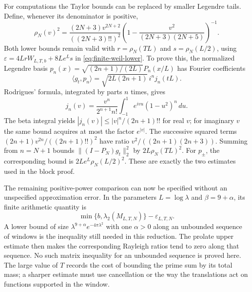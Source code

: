 For computations the Taylor bounds can be replaced by smaller
Legendre tails.  Define, whenever its denominator is positive,
\[
 \rho_N(v)^2=
 \frac{(2N+3)v^{2N+2}}{((2N+3)!!)^2}
 \left(1-\frac{v^2}{(2N+3)(2N+5)}\right)^{-1}.
\]
Both lower bounds remain valid with
$r=\rho_N(TL)$ and $s=\rho_N(L/2)$, using
$\varepsilon=4LrW_{L,T,b}+8Le^Ls$ in
\eqref{eq:finite-weil-lower}.  To prove this, the normalized Legendre
basis $p_n(x)=\sqrt{(2n+1)/(2L)}P_n(x/L)$ has Fourier coefficients
\[
 \langle g_t,p_n\rangle
        =\sqrt{2L(2n+1)}\,i^n j_n(tL).
\]
Rodrigues' formula, integrated by parts $n$ times, gives
\[
 j_n(v)=\frac{v^n}{2^{n+1}n!}
                  \int_{-1}^1e^{ivu}(1-u^2)^n\,du.
\]
The beta integral yields
$|j_n(v)|\le |v|^n/(2n+1)!!$ for real $v$; for imaginary $v$ the
same bound acquires at most the factor $e^{|v|}$.
The successive squared terms
$(2n+1)v^{2n}/((2n+1)!!)^2$ have ratio
$v^2/((2n+1)(2n+3))$.  Summing from $n=N+1$ bounds
$\|(I-P_N)g_t\|_2^2$ by $2L\rho_N(TL)^2$.
For $p_\pm$, the corresponding bound is
$2Le^L\rho_N(L/2)^2$.  These are exactly the two estimates used in
the block proof.

The remaining positive-power comparison can now be specified without
an unspecified approximation error.  In the parameters $L=\log\lambda$
and $\beta=9+\alpha$, its finite arithmetic quantity is
\[
 \min\{b,\lambda_2(M_{L,T,N})\}-\varepsilon_{L,T,N}.
\]
A lower bound of size $\lambda^{9+\alpha}e^{-4\pi\lambda^2}$
with one $\alpha>0$ along an unbounded sequence of windows is the
inequality still needed in this reduction.  The prolate upper estimate
then makes the corresponding Rayleigh ratios tend to zero along that
sequence.  No such matrix inequality for an unbounded sequence is
proved here.  The large value of $T$ records the cost of bounding the
prime sum by its total mass; a sharper estimate must use cancellation
or the way the translations act on functions supported in the window.
